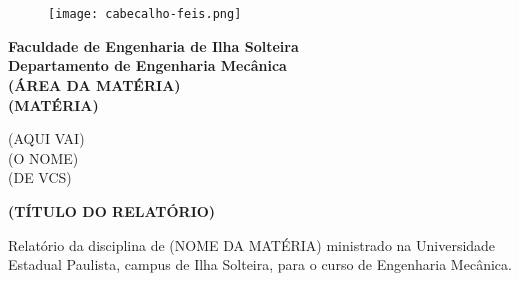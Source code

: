 
\section*{}
    \thispagestyle{empty}       %
    \vspace{-1 cm}              %
	
	\begin{center} 
		\begin{figure} [h] \centering
		    \texttt{[image: cabecalho-feis.png]}
		\end{figure}

		{\large \textbf{Faculdade de Engenharia de Ilha Solteira}}\\    %
		\vspace{\parskip}
		{\large \textbf{Departamento de Engenharia Mecânica}}\\         %
		\vspace{\parskip}
		{\large \textbf{(ÁREA DA MATÉRIA)}}\\                   %
		\vspace{\parskip}
		{\large \textbf{(MATÉRIA)}}\\    %
        
		
        \vspace{3.5 cm}

		{\Large {(AQUI VAI)}}\\ %
		{\Large {(O NOME)}}\\ %
		{\Large {(DE VCS)}}\\ %

		
		
        \vspace{3 cm}

		{\LARGE \textbf{(TÍTULO DO RELATÓRIO)}} \\


        \vspace{2 cm}
        
        \begin{flushright} %
		\begin{minipage}[20cm][5cm][b]{7cm}
			\begin{normalsize}{Relatório da disciplina de (NOME DA MATÉRIA) ministrado na Universidade Estadual Paulista, campus de Ilha Solteira, para o curso de Engenharia Mecânica.}\\
			\end{normalsize}
		\end{minipage}
	    \end{flushright}


		\\
		\noindent {\large { \today} }\\ 
	\end{center}
	\newpage

